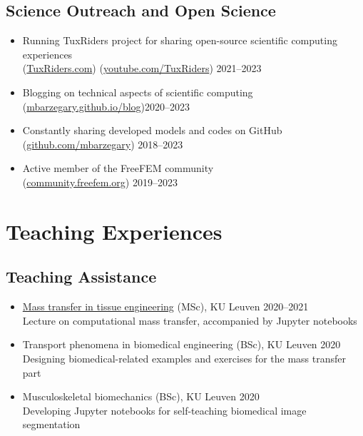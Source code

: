 \documentclass{cv}
\begin{document}
\subsection{Science Outreach and Open Science}

\begin{itemize}[itemsep=-0.2ex]
\item
Running TuxRiders project for sharing open-source scientific computing experiences \\
(\href{http://www.tuxriders.com/}{TuxRiders.com}) (\href{https://www.youtube.com/TuxRiders}{youtube.com/TuxRiders}) \hfill 2021--2023
\item
Blogging on technical aspects of scientific computing \\(\href{https://mbarzegary.github.io/blog}{mbarzegary.github.io/blog})\hfill 2020--2023
\item
Constantly sharing developed models and codes on GitHub \\(\href{https://github.com/mbarzegary}{github.com/mbarzegary}) \hfill 2018--2023
\item
Active member of the FreeFEM community\\(\href{https://community.freefem.org/}{community.freefem.org}) \hfill 2019--2023
\end{itemize}


\section{Teaching Experiences}

\subsection{Teaching Assistance}


\begin{itemize}[itemsep=-0.2ex]
\item 
\href{https://github.com/mbarzegary/mass-transport-tissue-engineering-fall2021}{Mass transfer in tissue engineering} (MSc), KU Leuven \hfill 2020--2021
\\
Lecture on computational mass transfer, accompanied by Jupyter notebooks 
\item 
Transport phenomena in biomedical engineering (BSc), KU Leuven \hfill 2020
\\
Designing biomedical-related examples and exercises for the mass transfer part
\item 
Musculoskeletal biomechanics (BSc), KU Leuven \hfill 2020
\\
Developing Jupyter notebooks for self-teaching biomedical image segmentation 
\end{itemize}
	
\end{document}
